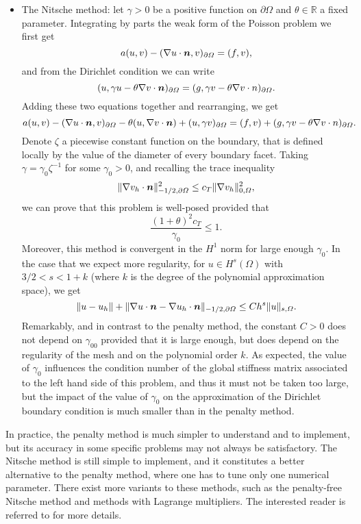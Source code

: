 \documentclass{article}
\renewcommand{\vec}{\vectorsym}
\begin{document}
\begin{itemize}
\item The Nitsche method: let $\gamma > 0$ be a positive function on $\partial\Omega$ and $\theta\in\mathbb{R}$ a fixed parameter. Integrating by parts the weak form of the Poisson problem we first get 
$$a(u,v) - (\nabla u\cdot \vec n, v)_{\partial\Omega} = (f,v),$$
and from the Dirichlet condition we can write 
$$(u,\gamma u -\theta\nabla v\cdot \vec n)_{\partial\Omega} = (g,\gamma v - \theta \nabla v \cdot n)_{\partial\Omega}.$$
Adding these two equations together and rearranging, we get 
$$a(u,v) - (\nabla u \cdot \vec n, v)_{\partial\Omega} - \theta (u,\nabla v\cdot  \vec n) + (u,\gamma v)_{\partial\Omega} = (f,v) + (g,\gamma v - \theta \nabla v\cdot n)_{\partial\Omega}.$$
Denote $\zeta$ a piecewise constant function on the boundary, that is defined locally by the value of the diameter of every boundary facet. Taking $\gamma = \gamma_0 \zeta^{-1}$ for some $\gamma_0>0$, and recalling the trace inequality 
$$\|\nabla v_h\cdot \vec n\|^2_{-1/2,\partial\Omega} \leq c_T \|\nabla v_h\|^2_{0,\Omega},$$
we can prove that this problem is well-posed provided that 
$$\frac{(1+\theta)^2 c_T}{\gamma_0}\leq 1.$$
Moreover, this method is convergent in the $H^1$ norm for large enough $\gamma_0$. In the case that we expect more regularity, for $u\in H^s(\Omega)$ with $3/2<s<1+k$ (where $k$ is the degree of the polynomial approximation space), we get
$$\|u-u_h\| + \|\nabla u\cdot \vec n - \nabla u_h\cdot \vec n\|_{-1/2,\partial\Omega} \leq Ch^s\|u\|_{s,\Omega}.$$
Remarkably, and in contrast to the penalty method, the constant $C>0$ does not depend on $\gamma_00$ provided that it is large enough, but does depend on the regularity of the mesh and on the polynomial order $k$. As expected, the value of $\gamma_0$ influences the condition number of the global stiffness matrix associated to the left hand side of this problem, and thus it must not be taken too large, but the impact of the value of $\gamma_0$ on the approximation of the Dirichlet boundary condition is much smaller than in the penalty method. 
\end{itemize}

In practice, the penalty method is much simpler to understand and to implement, but its accuracy in some specific problems may not always be satisfactory. The Nitsche method is still simple to implement, and it constitutes a better alternative to the penalty method, where one has to tune only one numerical parameter. There exist more variants to these methods, such as the penalty-free Nitsche method and methods with Lagrange multipliers. The interested reader is referred to \cite{Chouly2024} for more details.
\end{document}
